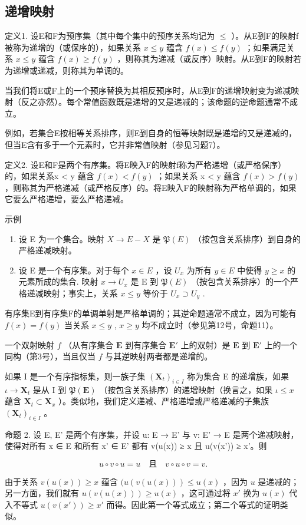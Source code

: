 \subsection{递增映射}

定义1. 设E和F为预序集（其中每个集中的预序关系均记为 \(\leqslant\) ）。从E到F的映射f被称为递增的（或保序的），如果关系 \(x \leqslant y\) 蕴含 \(f(x) \leqslant f(y)\) ；如果满足关系 \(x \leqslant y\) 蕴含 \(f(x) \geqslant f(y)\) ，则称其为递减（或反序）映射。从E到F的映射若为递增或递减，则称其为单调的。

当我们将E或F上的一个预序替换为其相反预序时，从E到F的递增映射变为递减映射（反之亦然）。每个常值函数既是递增的又是递减的；该命题的逆命题通常不成立。

例如，若集合E按相等关系排序，则E到自身的恒等映射既是递增的又是递减的，但当E含有多于一个元素时，它并非常值映射（参见习题7）。

定义2. 设E和F是两个有序集。将E映入F的映射f称为严格递增（或严格保序）的，如果关系x \textless{} y 蕴含 \(f(x) < f(y)\) ；如果关系 x \textless{} y 蕴含 \(f(x) > f(y)\) ，则称其为严格递减（或严格反序）的。将E映入F的映射称为严格单调的，如果它要么严格递增，要么严格递减。

示例

\begin{enumerate}
\def\labelenumi{(\arabic{enumi})}
\item
  设 E 为一个集合。映射 \(X \rightarrow E - X\) 是 \(\mathfrak{P}(E)\) （按包含关系排序）到自身的严格递减映射。
\item
  设 E 是一个有序集。对于每个 \(x \in E\) ，设 \(U_x\) 为所有 \(y \in E\) 中使得 \(y \geqslant x\) 的元素所成的集合. 映射 \(x \to U_x\) 是 E 到 \(\mathfrak{P}(E)\) （按包含关系排序）的一个严格递减映射；事实上，关系 \(x \leqslant y\) 等价于 \(U_x \supset U_y\) .
\end{enumerate}

有序集E到有序集F的单调单射是严格单调的；其逆命题通常不成立，因为可能有 \(f(x) = f(y)\) 当关系 \(x \leqslant y\) , \(x \geqslant y\) 均不成立时（参见第12号，命题11）。

一个双射映射 \(f\) （从有序集合 \(\mathbf{E}\) 到有序集合 \(\mathbf{E}'\) 上的双射）是 \(\mathbf{E}\) 到 \(\mathbf{E}'\) 上的一个同构（第3号），当且仅当 \(f\) 与其逆映射两者都是递增的。

如果 I 是一个有序指标集，则一族子集 \((\mathbf{X}_t)_{i \in I}\) 称为集合 E 的递增族，如果 \(\iota \to \mathbf{X}_t\) 是从 I 到 \(\mathfrak{P}(\mathbf{E})\) （按包含关系排序）的递增映射（换言之，如果 \(\iota \leqslant x\) 蕴含 \(\mathbf{X}_t \subset \mathbf{X}_x\) ）。类似地，我们定义递减、严格递增或严格递减的子集族 \((\mathbf{X}_t)_{i \in I}\) 。

命题 2. 设 E, E' 是两个有序集，并设 u: E → E' 与 v: E' → E 是两个递减映射，使得对所有 x ∈ E 和所有 x' ∈ E' 都有 v(u(x)) ≥ x 且 u(v(x')) ≥ x'。则

\[
u \circ v \circ u = u \quad \text{且} \quad v \circ u \circ v = v.
\]

由于关系 \(v(u(x)) \geqslant x\) 蕴含 \((u(v(u(x))) \leqslant u(x)\) ，因为 \(u\) 是递减的；另一方面，我们就有 \(u(v(u(x))) \geqslant u(x)\) ，这可通过将 \(x'\) 换为 \(u(x)\) 代入不等式 \(u(v(x')) \geqslant x'\) 而得。因此第一个等式成立；第二个等式的证明类似。

